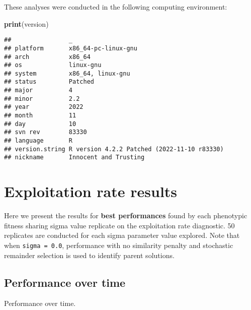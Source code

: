 \documentclass[]{book}
\newenvironment{Shaded}{\begin{snugshade}}{\end{snugshade}}
\newcommand{\KeywordTok}[1]{\textcolor[rgb]{0.13,0.29,0.53}{\textbf{#1}}}
\newcommand{\NormalTok}[1]{#1}
\begin{document}
These analyses were conducted in the following computing environment:

\begin{Shaded}
\begin{Highlighting}[]
\KeywordTok{print}\NormalTok{(version)}
\end{Highlighting}
\end{Shaded}

\begin{verbatim}
##                _                                          
## platform       x86_64-pc-linux-gnu                        
## arch           x86_64                                     
## os             linux-gnu                                  
## system         x86_64, linux-gnu                          
## status         Patched                                    
## major          4                                          
## minor          2.2                                        
## year           2022                                       
## month          11                                         
## day            10                                         
## svn rev        83330                                      
## language       R                                          
## version.string R version 4.2.2 Patched (2022-11-10 r83330)
## nickname       Innocent and Trusting
\end{verbatim}

\hypertarget{exploitation-rate-results-4}{%
\section{Exploitation rate results}\label{exploitation-rate-results-4}}

Here we present the results for \textbf{best performances} found by each phenotypic fitness sharing sigma value replicate on the exploitation rate diagnostic.
50 replicates are conducted for each sigma parameter value explored.
Note that when \texttt{sigma\ =\ 0.0}, performance with no similarity penalty and stochastic remainder selection is used to identify parent solutions.

\hypertarget{performance-over-time-11}{%
\subsection{Performance over time}\label{performance-over-time-11}}

Performance over time.
\end{document}
